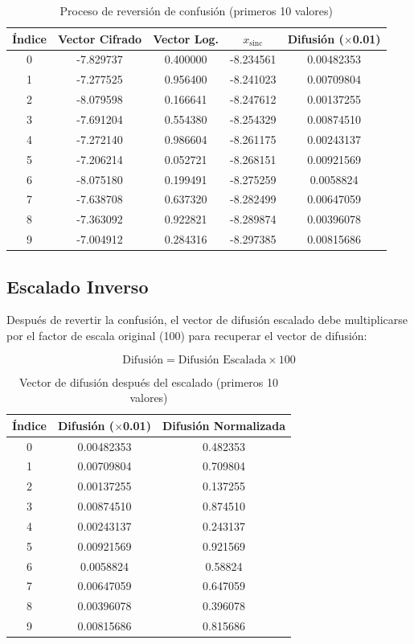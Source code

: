 \documentclass[12pt,a4paper]{article}
\begin{document}
	\begin{table}[H]
		\centering
		\caption{Proceso de reversión de confusión (primeros 10 valores)}
		\label{tab:reversion_confusion}
		\footnotesize
		\begin{tabular}{@{}ccccc@{}}
			\toprule
			\textbf{Índice} & \textbf{Vector Cifrado} & \textbf{Vector Log.} & \textbf{$x_{\text{sinc}}$} & \textbf{Difusión ($\times$0.01)} \\ \midrule
			0 & -7.829737 & 0.400000 & -8.234561 & 0.00482353 \\
			1 & -7.277525 & 0.956400 & -8.241023 & 0.00709804 \\
			2 & -8.079598 & 0.166641 & -8.247612 & 0.00137255 \\
			3 & -7.691204 & 0.554380 & -8.254329 & 0.00874510 \\
			4 & -7.272140 & 0.986604 & -8.261175 & 0.00243137 \\
			5 & -7.206214 & 0.052721 & -8.268151 & 0.00921569 \\
			6 & -8.075180 & 0.199491 & -8.275259 & 0.0058824 \\
			7 & -7.638708 & 0.637320 & -8.282499 & 0.00647059 \\
			8 & -7.363092 & 0.922821 & -8.289874 & 0.00396078 \\
			9 & -7.004912 & 0.284316 & -8.297385 & 0.00815686 \\ \bottomrule
		\end{tabular}
	\end{table}
	
	\subsection{Escalado Inverso}
	
	Después de revertir la confusión, el vector de difusión escalado debe multiplicarse por el factor de escala original (100) para recuperar el vector de difusión:
	
	$$\text{Difusión} = \text{Difusión Escalada} \times 100$$
	
	\begin{table}[H]
		\centering
		\caption{Vector de difusión después del escalado (primeros 10 valores)}
		\label{tab:difusion_escalada}
		\begin{tabular}{@{}ccc@{}}
			\toprule
			\textbf{Índice} & \textbf{Difusión ($\times$0.01)} & \textbf{Difusión Normalizada} \\ \midrule
			0 & 0.00482353 & 0.482353 \\
			1 & 0.00709804 & 0.709804 \\
			2 & 0.00137255 & 0.137255 \\
			3 & 0.00874510 & 0.874510 \\
			4 & 0.00243137 & 0.243137 \\
			5 & 0.00921569 & 0.921569 \\
			6 & 0.0058824 & 0.58824 \\
			7 & 0.00647059 & 0.647059 \\
			8 & 0.00396078 & 0.396078 \\
			9 & 0.00815686 & 0.815686 \\ \bottomrule
		\end{tabular}
	\end{table}
	
\end{document}
